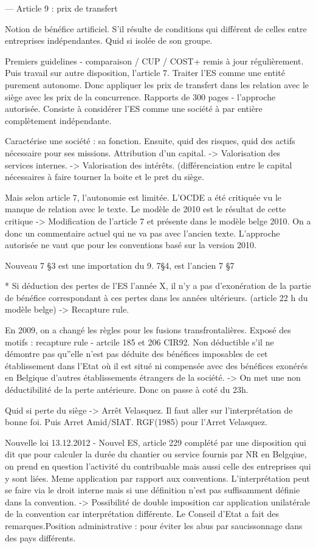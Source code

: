 \documentclass{book}
\begin{document}
---
Article 9 : prix de transfert

Notion de bénéfice artificiel. S'il résulte de conditions qui différent de celles entre entreprises indépendantes. Quid si isolée de son groupe.

Premiers guidelines - comparaison / CUP / COST+ remis à jour régulièrement. Puis travail sur autre disposition, l'article 7. Traiter l'ES comme une entité purement autonome. Donc appliquer les prix de transfert dans les relation avec le siège avec les prix de la concurrence. Rapports de 300 pages - l'approche autorisée. Consiste à considérer l'ES comme une société à par entière complètement indépendante.

Caractérise une société : sa fonction. Ensuite, quid des risques, quid des actifs nécessaire pour ses missions. Attribution d'un capital.
-> Valorisation des services internes.
-> Valorisation des intérêts. (différenciation entre le capital nécessaires à faire tourner la boite et le pret du siège.

Mais selon article 7, l'autonomie est limitée. L'OCDE a été critiquée vu le manque de relation avec le texte. Le modèle de 2010 est le résultat de cette critique -> Modification de l'article 7 et présente dans le modèle belge 2010. On a donc un commentaire actuel qui ne va pas avec l'ancien texte. L'approche autorisée ne vaut que pour les conventions basé sur la version 2010.

Nouveau 7 §3 est une importation du 9. 7§4, est l'ancien 7 §7


* Si déduction des pertes de l'ES l'année X, il n'y a pas d'exonération de la partie de bénéfice correspondant à ces pertes dans les années ultérieurs. (article 22 h du modèle belge) -> Recapture rule.

En 2009, on a changé les règles pour les fusions transfrontalières. Exposé des motifs : recapture rule - artcile 185 et 206 CIR92. Non déductible s'il ne démontre pas qu''elle n'est pas déduite des bénéfices imposables de cet établissement dans l'Etat où il est situé ni compensée avec des bénéfices exonérés en Belgique d'autres établissements étrangers de la société. -> On met une non déductibilité de la perte antérieure. Donc on passe à coté du 23h.


Quid si perte du siège -> Arrêt Velasquez. Il faut aller sur l'interprétation de bonne foi. Puis Arret Amid/SIAT. RGF(1985) pour l'Arret Velasquez.

Nouvelle loi 13.12.2012 - Nouvel ES, article 229 complété par une disposition qui dit que pour calculer la durée du chantier ou service fournis par NR en Belgqiue, on prend en question l'activité du contribuable mais aussi celle des entreprises qui y sont liées. Meme application par rapport aux conventions. L'interprétation peut se faire via le droit interne mais si une définition n'est pas suffisamment définie dans la convention. -> Possibilité de double imposition car application unilatérale de la convention car interprétation différente. Le Conseil d'Etat a fait des remarques.Position administrative : pour éviter les abus par saucissonnage dans des pays différents.
\end{document}
